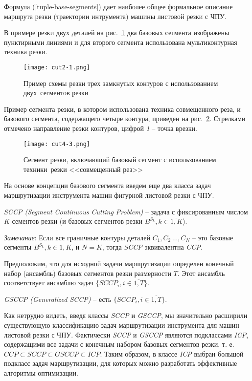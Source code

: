 Формула (\ref{tuple-base-segments})
дает наиболее общее формальное описание маршрута резки (траектории интрумента)
машины листовой резки с ЧПУ.

В примере резки двух деталей
на рис.~\ref{cut2-1}
два базовых сегмента изображены пунктирными
линиями
и для второго сегмента
использована мультиконтурная техника резки.

\begin{figure}[H]
  \centering
  \texttt{[image: cut2-1.png]}
  \caption{
    Пример схемы резки трех замкнутых контуров
    с использованием двух~сегментов резки
  }
  \label{cut2-1}
\end{figure}

Пример сегмента резки, в котором использована техника совмещенного реза,
и базового сегмента, содержащего четыре контура,
приведен на рис.~\ref{cut4-3}.
Стрелками отмечено направление резки контуров,
цифрой {\it 1} -- точка врезки.

\begin{figure}[H]
  \centering
  \texttt{[image: cut4-3.png]}
  \caption{
    Сегмент резки, включающий базовый сегмент
    с использованием техники~резки <<совмещенный рез>>
  }
  \label{cut4-3}
\end{figure}

На основе концепции базового сегмента введем еще
два класса задач маршрутизации инструмента машин
фигурной листовой резки с ЧПУ.

\begin{opred}
  \label{def:SCCP}
  {\it SCCP (Segment Continuous Cutting Problem)}
  --
  задача с фиксированным числом $K$
  сементов резки
  (и базовых сегментов резки
  $B^{S_k}, k \in \overline{1, K}$).
\end{opred}

{\it Замечание}:
Если все граничные контуры деталей
$C_1, C_2 \,\dots, C_N$ --
это базовые сегменты $B^{S_k}, k \in \overline{1,K}$,
и $N=K$,
тогда {\it SCCP} эквивалентна {\it CCP}.

Предположим, что для исходной задачи маршрутизации
определен конечный набор (ансамбль)
базовых сегментов резки размерности $T$.
Этот ансамбль соответствует ансамблю задач
$\{SCCP_i, i \in\overline{1,T}\}$.

\begin{opred}
  {\it GSCCP (Generalized SCCP)} -- есть
  $\{SCCP_i, i \in\overline{1,T}\}$.
\end{opred}

Как нетрудно видеть,
введя классы {\it SCCP} и {\it GSCCP},
мы значительно расширили существующую
классификацию задач маршрутизации инструмента
для машин листовой резки с ЧПУ.
Фактически {\it SCCP} и {\it GSCCP} являются подклассами {\it ICP},
содержащими все задачи с конечным набором базовых сегментов резки,
т. е.
$CCP \subset SCCP \subset GSCCP \subset ICP$.
Таким образом, в классе {\it ICP} выбран большой подкласс
задач маршрутизации,
для которых можно разработать эффективные алгоритмы оптимизации.

